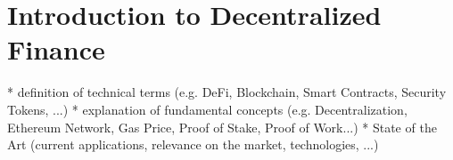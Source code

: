 \chapter{Introduction to Decentralized Finance }
\label{cha:IntroductionDecentralizedFinance}

* definition of technical terms (e.g. DeFi, Blockchain, Smart Contracts, Security Tokens, ...)
* explanation of fundamental concepts (e.g. Decentralization, Ethereum Network, Gas Price, Proof of Stake, Proof of Work...)
* State of the Art (current applications, relevance on the market, technologies, ...)